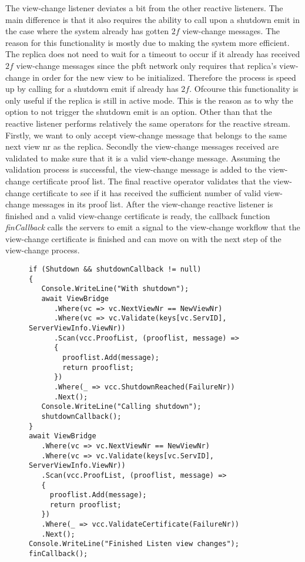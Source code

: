 The view-change listener deviates a bit from the other reactive listeners. The main difference is that it also requires the ability to call upon a shutdown emit in the case where the system already has gotten $2f$ view-change messages. The reason for this functionality is mostly due to making the system more efficient. The replica does not need to wait for a timeout to occur if it already has received $2f$ view-change messages since the \ac{pbft} network only requires that replica's view-change in order for the new view to be initialized. Therefore the process is speed up by calling for a shutdown emit if already has $2f$. Ofcourse this functionality is only useful if the replica is still in active mode. This is the reason as to why the option to not trigger the shutdown emit is an option. Other than that the reactive listener performs relatively the same operators for the reactive stream. Firstly, we want to only accept view-change message that belongs to the same next view nr as the replica. Secondly the view-change messages received are validated to make sure that it is a valid view-change message. Assuming the validation process is successful, the view-change message is added to the view-change certificate proof list. The final reactive operator validates that the view-change certificate to see if it has received the sufficient number of valid view-change messages in its proof list. After the view-change reactive listener is finished and a valid view-change certificate is ready, the callback function \emph{finCallback} calls the servers to emit a signal to the view-change workflow that the view-change certificate is finished and can move on with the next step of the view-change process. 

\begin{figure}[H]
	\centering
	\begin{lstlisting}[label = code:viewListener, caption=Handling timeout for the normal protocol workflow, captionpos = b, basicstyle=\scriptsize]
if (Shutdown && shutdownCallback != null)
{
   Console.WriteLine("With shutdown");
   await ViewBridge
      .Where(vc => vc.NextViewNr == NewViewNr)
      .Where(vc => vc.Validate(keys[vc.ServID], ServerViewInfo.ViewNr))
      .Scan(vcc.ProofList, (prooflist, message) =>
      {
        prooflist.Add(message);
        return prooflist;
      })
      .Where(_ => vcc.ShutdownReached(FailureNr))
      .Next();
   Console.WriteLine("Calling shutdown");
   shutdownCallback();
}
await ViewBridge
   .Where(vc => vc.NextViewNr == NewViewNr)
   .Where(vc => vc.Validate(keys[vc.ServID], ServerViewInfo.ViewNr))
   .Scan(vcc.ProofList, (prooflist, message) =>
   {
     prooflist.Add(message);
     return prooflist;
   })
   .Where(_ => vcc.ValidateCertificate(FailureNr))
   .Next();
Console.WriteLine("Finished Listen view changes");
finCallback();
    \end{lstlisting}
\end{figure} 

